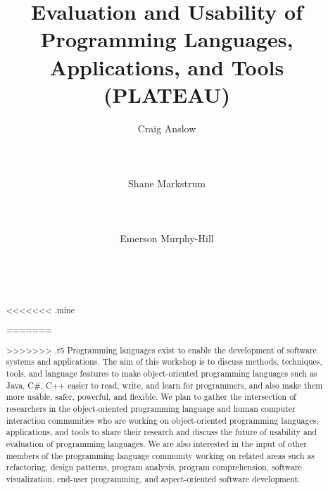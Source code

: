 \documentclass{acm_proc_article-sp}
\begin{document}
\title{Evaluation and Usability of Programming Languages, Applications, and Tools  (PLATEAU)}

\author{
\alignauthor Craig Anslow\\
       \\
       \\
       \\
\alignauthor Shane Markstrum\\
       \\
       \\
       \\
\alignauthor Emerson Murphy-Hill\\
       \\
       \\
       \\
       }

\date{}

\maketitle
\begin{abstract}
<<<<<<< .mine

=======
 
>>>>>>> .r5
Programming languages exist to enable the development of software systems and applications. The aim of this workshop is to discuss methods, techniques, tools, and language features to make object-oriented programming languages such as Java, C\#, C++ easier to read, write, and learn for programmers, and also make them more usable, safer, powerful, and flexible. We plan to gather the intersection of researchers in the object-oriented programming language and human computer interaction communities who are working on object-oriented programming languages, applications, and tools to share their research and discuss the future of usability and evaluation of programming languages. We are also interested in the input of other members of the programming language community working on related areas such as refactoring, design patterns, program analysis, program comprehension, software visualization, end-user programming, and aspect-oriented software development.

\end{abstract}
\end{document}
